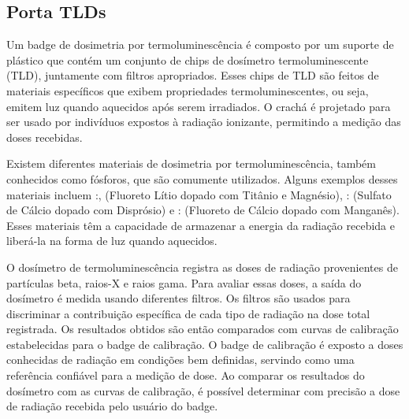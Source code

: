 \documentclass[11pt,a4paper]{article}
\newcounter{exemplo}
\begin{document}
\subsection*{Porta TLDs}

	Um badge de dosimetria por termoluminescência é composto por um suporte de plástico que contém um conjunto de chips de dosímetro termoluminescente (TLD), juntamente com filtros apropriados. Esses chips de TLD são feitos de materiais específicos que exibem propriedades termoluminescentes, ou seja, emitem luz quando aquecidos após serem irradiados. O crachá é projetado para ser usado por indivíduos expostos à radiação ionizante, permitindo a medição das doses recebidas.

	Existem diferentes materiais de dosimetria por termoluminescência, também conhecidos como fósforos, que são comumente utilizados. Alguns exemplos desses materiais incluem :, (Fluoreto Lítio dopado  com Titânio e Magnésio), : (Sulfato de Cálcio dopado com Disprósio) e : (Fluoreto de Cálcio dopado com Manganês). Esses materiais têm a capacidade de armazenar a energia da radiação recebida e liberá-la na forma de luz quando aquecidos.

	O dosímetro de termoluminescência registra as doses de radiação provenientes de partículas beta, raios-X e raios gama. Para avaliar essas doses, a saída do dosímetro é medida usando diferentes filtros. Os filtros são usados para discriminar a contribuição específica de cada tipo de radiação na dose total registrada. Os resultados obtidos são então comparados com curvas de calibração estabelecidas para o badge de calibração. O badge de calibração é exposto a doses conhecidas de radiação em condições bem definidas, servindo como uma referência confiável para a medição de dose. Ao comparar os resultados do dosímetro com as curvas de calibração, é possível determinar com precisão a dose de radiação recebida pelo usuário do badge.
\end{document}

